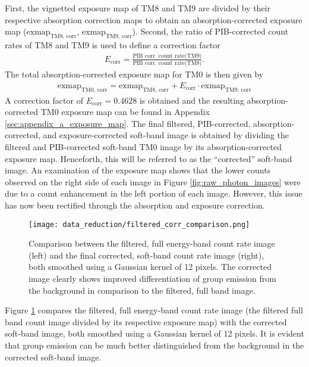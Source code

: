 First, the vignetted exposure map of TM8 and TM9 are divided by their respective absorption correction maps to obtain an absorption-corrected exposure map (\(\text{exmap}_\text{TM8, corr}\), \(\text{exmap}_\text{TM9, corr}\)). Second, the ratio of PIB-corrected count rates of TM8 and TM9 is used to define a correction factor 
\begin{align*}
    E_\text{corr} = \frac{\text{PIB corr. count rate(TM9)}}{\text{PIB corr. count rate(TM8)}}.
\end{align*}
The total absorption-corrected exposure map for TM0 is then given by
\begin{align*}
    \text{exmap}_\text{TM0, corr} = \text{exmap}_\text{TM8, corr} + E_\text{corr}\cdot\text{exmap}_\text{TM9, corr} 
\end{align*}
A correction factor of \(E_\text{corr} = 0.4628\) is obtained and the resulting absorption-corrected TM0 exposure map can be found in Appendix \ref{sec:appendix_a_exposure_map}. The final filtered, PIB-corrected, absorption-corrected, and exposure-corrected soft-band image is obtained by dividing the filtered and PIB-corrected soft-band TM0 image by its absorption-corrected exposure map. Henceforth, this will be referred to as the \enquote{corrected} soft-band image. An examination of the exposure map shows that the lower counts observed on the right side of each image in Figure \ref{fig:raw_photon_images} were due to a count enhancement in the left portion of each image. However, this issue has now been rectified through the absorption and exposure correction.
%
\begin{figure}[htbp]
    \centering
    \texttt{[image: data\_reduction/filtered\_corr\_comparison.png]}
    \caption[Comparison between the filtered, full energy-band count rate image and the final corrected, soft-band image.]{Comparison between the filtered, full energy-band count rate image (left) and the final corrected, soft-band count rate image (right), both smoothed using a Gaussian kernel of 12 pixels. The corrected image clearly shows improved differentiation of group emission from the background in comparison to the filtered, full band image.}
    \label{fig:comparison_filt_corr}
\end{figure}

Figure \ref{fig:comparison_filt_corr} compares the filtered, full energy-band count rate image (the filtered full band count image divided by its respective exposure map) with the corrected soft-band image, both smoothed using a Gaussian kernel of 12 pixels. It is evident that group emission can be much better distinguished from the background in the corrected soft-band image. 
%
